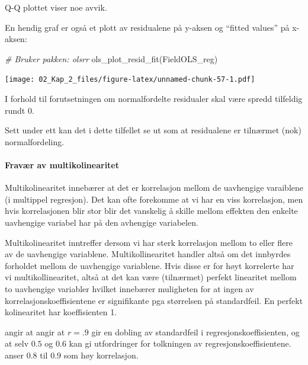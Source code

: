 \documentclass[
]{article}
\newenvironment{Shaded}{\begin{snugshade}}{\end{snugshade}}
\newcommand{\CommentTok}[1]{\textcolor[rgb]{0.56,0.35,0.01}{\textit{#1}}}
\newcommand{\FunctionTok}[1]{\textcolor[rgb]{0.00,0.00,0.00}{#1}}
\newcommand{\NormalTok}[1]{#1}
\begin{document}
Q-Q plottet viser noe avvik.

En hendig graf er også et plott av residualene på y-aksen og ``fitted values'' på x-aksen:

\begin{Shaded}
\begin{Highlighting}[]
\CommentTok{\# Bruker pakken: olsrr}
\FunctionTok{ols\_plot\_resid\_fit}\NormalTok{(FieldOLS\_reg)}
\end{Highlighting}
\end{Shaded}

\texttt{[image: 02\_Kap\_2\_files/figure-latex/unnamed-chunk-57-1.pdf]}

I forhold til forutsetningen om normalfordelte residualer skal være spredd tilfeldig rundt 0.

Sett under ett kan det i dette tilfellet se ut som at residualene er tilnærmet (nok) normalfordeling.

\hypertarget{fravuxe6r-av-multikolinearitet}{%
\paragraph{Fravær av multikolinearitet}\label{fravuxe6r-av-multikolinearitet}}

Multikolinearitet innebærer at det er korrelasjon mellom de uavhengige varaiblene (i multippel regresjon). Det kan ofte forekomme at vi har en viss korrelasjon, men hvis korrelasjonen blir stor blir det vanskelig å skille mellom effekten den enkelte uavhengige variabel har på den avhengige variabelen.

Multikolinearitet inntreffer dersom vi har sterk korrelasjon mellom to eller flere av de uavhengige variablene. Multikollinearitet handler altså om det innbyrdes forholdet mellom de uavhengige variablene. Hvis disse er for høyt korrelerte har vi multikollinearitet, altså at det kan være (tilnærmet) perfekt linearitet mellom to uavhengige variabler \citep{berryUnderstandingRegressionAssumptions1993} hvilket innebærer muligheten for at ingen av korrelasjonskoeffisientene er signifikante pga størrelsen på standardfeil. En perfekt kolinearitet har koeffisienten 1.

\citet{berryUnderstandingRegressionAssumptions1993} angir at angir at \(r=.9\) gir en dobling av standardfeil i regresjonskoeffisienten, og at selv \(0.5\) og \(0.6\) kan gi utfordringer for tolkningen av regresjonskoeffisientene. \citet{fieldDiscoveringStatisticsUsing2009} anser \(0.8\) til \(0.9\) som høy korrelasjon.
\end{document}
